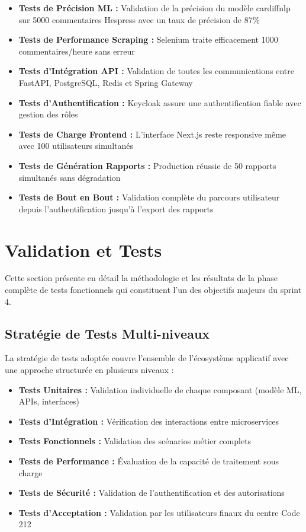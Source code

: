 \begin{itemize}
    \item \textbf{Tests de Précision ML :} Validation de la précision du modèle cardiffnlp sur 5000 commentaires Hespress avec un taux de précision de 87\%
    \item \textbf{Tests de Performance Scraping :} Selenium traite efficacement 1000 commentaires/heure sans erreur
    \item \textbf{Tests d'Intégration API :} Validation de toutes les communications entre FastAPI, PostgreSQL, Redis et Spring Gateway
    \item \textbf{Tests d'Authentification :} Keycloak assure une authentification fiable avec gestion des rôles
    \item \textbf{Tests de Charge Frontend :} L'interface Next.js reste responsive même avec 100 utilisateurs simultanés
    \item \textbf{Tests de Génération Rapports :} Production réussie de 50 rapports simultanés sans dégradation
    \item \textbf{Tests de Bout en Bout :} Validation complète du parcours utilisateur depuis l'authentification jusqu'à l'export des rapports
\end{itemize}

\section{Validation et Tests}

Cette section présente en détail la méthodologie et les résultats de la phase complète de tests fonctionnels qui constituent l'un des objectifs majeurs du sprint 4.

\subsection{Stratégie de Tests Multi-niveaux}

La stratégie de tests adoptée couvre l'ensemble de l'écosystème applicatif avec une approche structurée en plusieurs niveaux :

\begin{itemize}
    \item \textbf{Tests Unitaires :} Validation individuelle de chaque composant (modèle ML, APIs, interfaces)
    \item \textbf{Tests d'Intégration :} Vérification des interactions entre microservices
    \item \textbf{Tests Fonctionnels :} Validation des scénarios métier complets
    \item \textbf{Tests de Performance :} Évaluation de la capacité de traitement sous charge
    \item \textbf{Tests de Sécurité :} Validation de l'authentification et des autorisations
    \item \textbf{Tests d'Acceptation :} Validation par les utilisateurs finaux du centre Code 212
\end{itemize}

